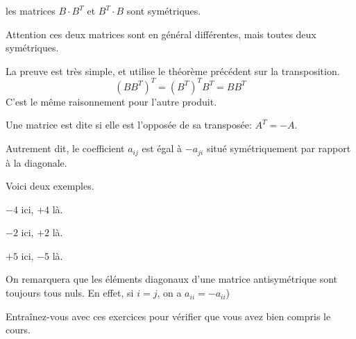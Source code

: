 les matrices $B \cdot B^T$ et $B^T \cdot B$ sont symétriques. 

Attention ces deux matrices sont en général différentes, mais toutes deux symétriques.


\change
La preuve est très simple, et utilise le théorème précédent sur la transposition.
\[
(BB^T)^T = (B^T)^T B^T = BB^T 
\]
C'est le même raisonnement pour l'autre produit.

\diapo

Une matrice est dite  si elle est l'opposée de sa transposée:
$A^T = - A$.

\change
Autrement dit, le coefficient $a_{ij}$ est égal à $-a_{ji}$
situé symétriquement par rapport à la diagonale.

\change
Voici deux exemples.



$-4$ ici, $+4$ là.

$-2$ ici, $+2$ là.

$+5$ ici, $-5$ là.

\change
On remarquera que les éléments diagonaux d'une matrice antisymétrique sont 
toujours tous nuls. En effet, si $i=j$, on a $a_{ii} = - a_{ii}$)

\diapo

Entraînez-vous avec ces exercices pour vérifier que vous avez bien compris le cours.


